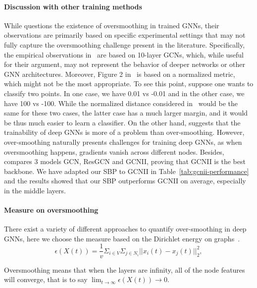 \paragraph{Discussion with other training methods}
While \cite{Peng2024BeyondOU} questions the existence of oversmoothing in trained GNNs, their observations are primarily based on specific experimental settings that may not fully capture the oversmoothing challenge present in the literature. Specifically, the empirical observations in~\cite{Peng2024BeyondOU} are based on 10-layer GCNs, which, while useful for their argument, may not represent the behavior of deeper networks or other GNN architectures. Moreover, Figure 2 in~\cite{Peng2024BeyondOU}  is based on a normalized metric, which might not be the most appropriate. To see this point, suppose one wants to classify two points. In one case, we have 0.01 vs -0.01 and in the other case, we have 100 vs -100. While the normalized distance considered in~\cite{Peng2024BeyondOU} would be the same for these two cases, the latter case has a much larger margin, and it would be thus much easier to learn a classifier.
On the other hand, \cite{Cong2021OnPB} suggests that the trainability of deep GNNs is more of a problem than over-smoothing. However, over-smoothing naturally presents challenges for training deep GNNs, as when oversmoothing happens, gradients vanish across different nodes. Besides, \cite{Cong2021OnPB}compares 3 models GCN, ResGCN and GCNII, proving that GCNII is the best backbone. We have adapted our SBP to GCNII in Table~\ref{tab:gcnii-performance} and the results showed that our SBP outperforms GCNII on average, especially in the middle layers.

\paragraph{Measure on oversmoothing}
There exist a variety of different approaches to quantify over-smoothing in deep GNNs, here we choose the measure based on the Dirichlet energy on graphs~\citep{wu2023demystifying,graph_oversmoothing_survey}.
\begin{equation}
    \epsilon(X(t))=\frac{1}{v}\Sigma_{i\in V}\Sigma_{j \in N_i}||x_i(t)-x_j(t)||_2^2,
\end{equation}

Oversmoothing means that when the layers are infinity, all of the node features will converge, that is to say $\lim_{t \to \infty}\epsilon(X(t))\to 0$.

